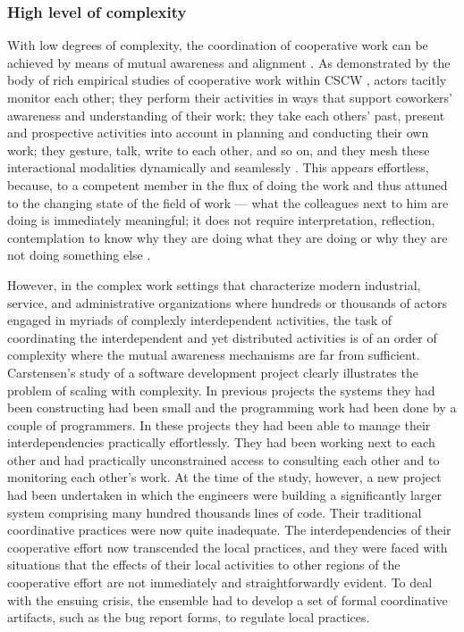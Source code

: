 \subsubsection{High level of complexity} %
\label{ssub:high_level_of_complexity}
With low degrees of complexity, the coordination of cooperative work can be achieved by means of mutual awareness and alignment \cite{schmidt2002a}. As demonstrated by the body of rich empirical studies of cooperative work within CSCW \cite{heath2002a}, actors tacitly monitor each other; they perform their activities in ways that support coworkers' awareness and understanding of their work; they take each others' past, present and prospective activities into account in planning and conducting their own work; they gesture, talk, write to each other, and so on, and they mesh these interactional modalities dynamically and seamlessly . This appears effortless, because, to a competent member in the flux of doing the work and thus attuned to the changing state of the field of work — what the colleagues next to him are doing is immediately meaningful; it does not require interpretation, reflection, contemplation to know why they are doing what they are doing or why they are not doing something else \cite{schmidt2002a}.

However, in the complex work settings that characterize modern industrial, service, and administrative organizations where hundreds or thousands of actors engaged in myriads of complexly interdependent activities, the task of coordinating the interdependent and yet distributed activities is of an order of complexity where the mutual awareness mechanisms are far from sufficient. Carstensen’s study of a software development project \cite{carstensen1994we} clearly illustrates the problem of scaling with complexity. In previous projects the systems they had been constructing had been small and the programming work had been done by a couple of programmers. In these projects they had been able to manage their interdependencies practically effortlessly. They had been working next to each other and had practically unconstrained access to consulting each other and to monitoring each other’s work. At the time of the study, however, a new project had been undertaken in which the engineers were building a significantly larger system comprising many hundred thousands lines of code. Their traditional coordinative practices were now quite inadequate. The interdependencies of their cooperative effort now transcended the local practices, and they were faced with situations that the effects of their local activities to other regions of the cooperative effort are not immediately and straightforwardly evident. To deal with the ensuing crisis, the ensemble had to develop a set of formal coordinative artifacts, such as the bug report forms, to regulate local practices.

